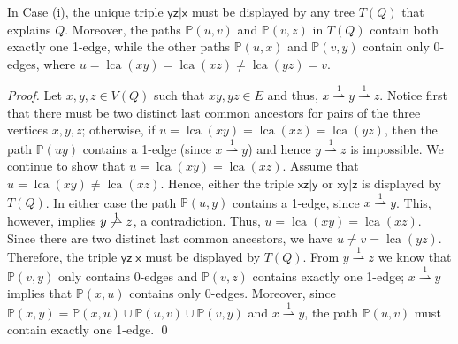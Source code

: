 \documentclass[smallextended]{svjour3}
\newcommand{\Rld}{\mathrel{\overset{1}{\rightharpoonup}}}
\renewcommand{\P}{\mathbb{P}}
\newcommand{\lca}[1]{\mathop{lca}(#1)}
\newcommand{\rt}[1]{\ensuremath{\mathsf{#1}}}
\begin{document}
\begin{lemma}
  In Case (i), the unique triple $\rt{yz|x}$ must be displayed by
  any tree $T(Q)$ that explains $Q$.  Moreover, the paths $\P(u,v)$ and
  $\P(v,z)$ in $T(Q)$ contain both exactly one 1-edge, while the other
  paths $\P(u,x)$ and $\P(v,y)$ contain only 0-edges, where
  $u=\lca{xy}=\lca{xz} \neq \lca{yz}=v$.
  \label{lem:case-i}
\end{lemma}
\begin{proof}
  Let $x,y,z\in V(Q)$ such that $xy, yz \in E$ and thus, $x\Rld y \Rld z$.
  Notice first that there must be two distinct last common ancestors for
  pairs of the three vertices $x,y,z$; otherwise, if
  $u=\lca{xy}=\lca{xz} = \lca{yz}$, then the path $\P(uy)$ contains a
  1-edge (since $x\Rld y$) and hence $y\Rld z$ is impossible.  We
  continue to show that $u=\lca{xy}=\lca{xz}$.  Assume that $u=\lca{xy}\neq
  \lca{xz}$.  Hence, either the triple $\rt{xz|y}$ or $\rt{xy|z}$ is
  displayed by $T(Q)$. In either case the path $\P(u,y)$ contains a 1-edge,
  since $x\Rld y$. This, however, implies $y\not\Rld z$, a contradiction.
  Thus, $u=\lca{xy} = \lca{xz}$. Since there are two distinct last common
  ancestors, we have $u\neq v=\lca{yz}$.  Therefore, the triple $\rt{yz|x}$
  must be displayed by $T(Q)$. From $y\Rld z$ we know that  $\P(v,y)$ only
  contains 0-edges and $\P(v,z)$ contains exactly one 1-edge;  $x\Rld y$
  implies that $\P(x,u)$ contains only 0-edges.  Moreover, since $\P(x,y) =
  \P(x,u)\cup \P(u,v)\cup \P(v,y)$ and $x\Rld y$, the path $\P(u,v)$ must
  contain exactly one 1-edge.  
  \qed
\end{proof}
\end{document}
